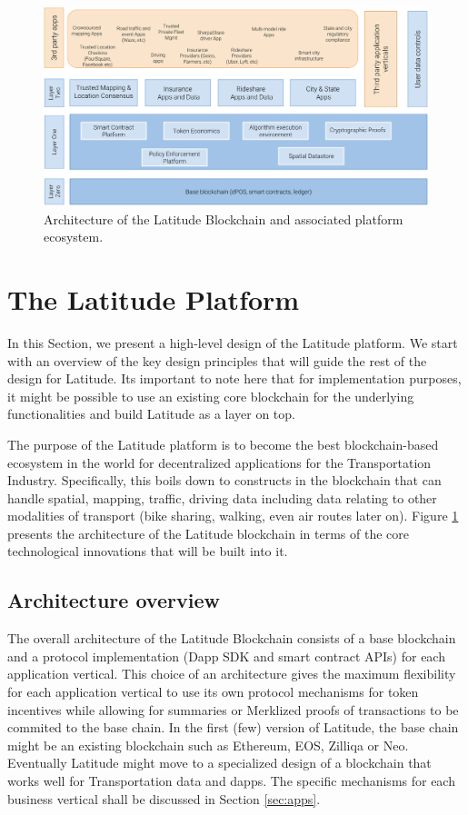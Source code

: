 \begin{figure}[t]
    \centering
    \includegraphics[width=1.00\textwidth]{lat-arch-2.png}
  \caption{Architecture of the Latitude Blockchain and associated platform ecosystem.}
    \label{fig:lat-arch}
\end{figure}

\section{The Latitude Platform}\label{sec:design}

In this Section, we present a high-level design of the Latitude platform.  We start with an overview of the key design
principles that will guide the rest of the design for Latitude. Its important to note here that for implementation
purposes, it might be possible to use an existing core blockchain for the underlying functionalities and build Latitude
as a layer on top.

The purpose of the Latitude platform is to become the best blockchain-based ecosystem in the world for decentralized
applications for the Transportation Industry. Specifically, this boils down to constructs in the blockchain that can
handle spatial, mapping, traffic, driving data including data relating to other modalities of transport (bike sharing,
walking, even air routes later on). Figure \ref{fig:lat-arch} presents the architecture of the Latitude blockchain in
terms of the core technological innovations that will be built into it.

\subsection{Architecture overview}
\label{sec:arch}

The overall architecture of the Latitude Blockchain consists of a base blockchain and a protocol implementation (Dapp
SDK and smart contract APIs) for each application vertical. This choice of an architecture gives the maximum flexibility
for each application vertical to use its own protocol mechanisms for token incentives while allowing for summaries or
Merklized proofs of transactions to be commited to the base chain. In the first (few) version of Latitude, the base
chain might be an existing blockchain such as Ethereum, EOS, Zilliqa or Neo. Eventually Latitude might move to a
specialized design of a blockchain that works well for Transportation data and dapps. The specific mechanisms for each
business vertical shall be discussed in Section \ref{sec:apps}.

